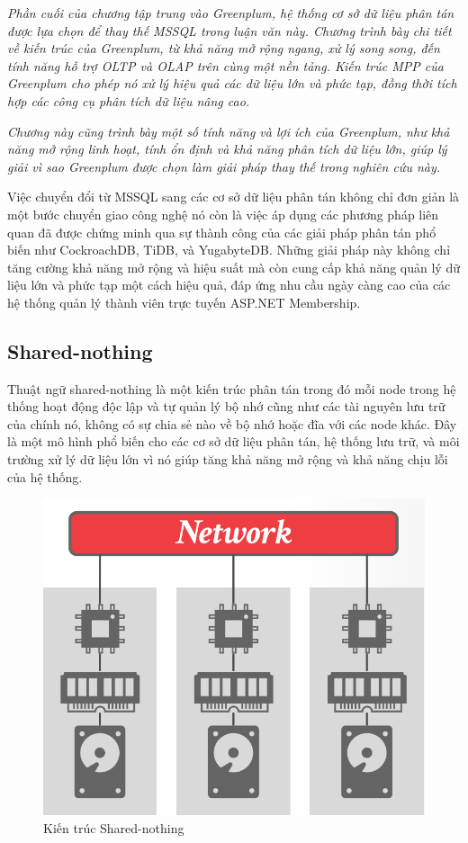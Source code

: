 \documentclass[50pt]{extarticle}
\begin{document}
\textit{Phần cuối của chương tập trung vào Greenplum, hệ thống cơ sở dữ liệu phân tán được lựa chọn để thay thế MSSQL trong luận văn này. Chương trình bày chi tiết về kiến trúc của Greenplum, từ khả năng mở rộng ngang, xử lý song song, đến tính năng hỗ trợ OLTP và OLAP trên cùng một nền tảng. Kiến trúc MPP của Greenplum cho phép nó xử lý hiệu quả các dữ liệu lớn và phức tạp, đồng thời tích hợp các công cụ phân tích dữ liệu nâng cao.}

\textit{Chương này cũng trình bày một số tính năng và lợi ích của Greenplum, như khả năng mở rộng linh hoạt, tính ổn định và khả năng phân tích dữ liệu lớn, giúp lý giải vì sao Greenplum được chọn làm giải pháp thay thế trong nghiên cứu này.}

Việc chuyển đổi từ MSSQL sang các cơ sở dữ liệu phân tán không chỉ đơn giản là một bước chuyển giao công nghệ nó còn là việc áp dụng các phương pháp liên quan đã được chứng minh qua sự thành công của các giải pháp phân tán phổ biến như CockroachDB, TiDB, và YugabyteDB. Những giải pháp này không chỉ tăng cường khả năng mở rộng và hiệu suất mà còn cung cấp khả năng quản lý dữ liệu lớn và phức tạp một cách hiệu quả, đáp ứng nhu cầu ngày càng cao của các hệ thống quản lý thành viên trực tuyến ASP.NET Membership.

\subsection{Shared-nothing}

Thuật ngữ shared-nothing \cite{article} là một kiến trúc phân tán trong đó mỗi node trong hệ thống hoạt động độc lập và tự quản lý bộ nhớ cũng như các tài nguyên lưu trữ của chính nó, không có sự chia sẻ nào về bộ nhớ hoặc đĩa với các node khác. Đây là một mô hình phổ biến cho các cơ sở dữ liệu phân tán, hệ thống lưu trữ, và môi trường xử lý dữ liệu lớn vì nó giúp tăng khả năng mở rộng và khả năng chịu lỗi của hệ thống.

\begin{figure}
    \centering
    \includegraphics[width=1\linewidth]{images/ShareNothingAr.png}
    \caption{Kiến trúc Shared-nothing}
    \label{fig:ShareNothingAr}
\end{figure}
\end{document}
